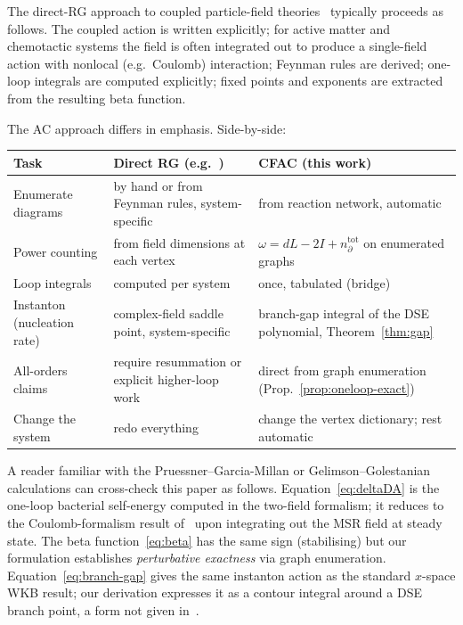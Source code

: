 \documentclass[11pt,a4paper]{article}
\theoremstyle{plain}
\begin{document}
The direct-RG approach to coupled particle-field
theories~\cite{PruessnerGarciaMillan2025,Bothe2023,%
GelimsonGolestanian2015} typically proceeds as follows.  The
coupled action is written explicitly; for active matter and
chemotactic systems the field is often integrated out to produce
a single-field action with nonlocal (e.g.\ Coulomb)
interaction; Feynman rules are derived; one-loop integrals are
computed explicitly; fixed points and exponents are extracted from
the resulting beta function.

The AC approach differs in emphasis.  Side-by-side:

\begin{center}\small
\begin{tabular}{@{}p{}p{}p{}@{}}
\toprule
\textbf{Task} & \textbf{Direct RG (e.g.\ \cite{PruessnerGarciaMillan2025,GelimsonGolestanian2015})} & \textbf{CFAC (this work)} \\
\midrule
Enumerate diagrams & by hand or from Feynman rules, system-specific & from reaction network, automatic \\
\addlinespace
Power counting & from field dimensions at each vertex & $\omega = dL - 2I + n_\partial^{\mathrm{tot}}$ on enumerated graphs \\
\addlinespace
Loop integrals & computed per system & once, tabulated (bridge) \\
\addlinespace
Instanton (nucleation rate) & complex-field saddle point, system-specific & branch-gap integral of the DSE polynomial, Theorem~\ref{thm:gap} \\
\addlinespace
All-orders claims & require resummation or explicit higher-loop work & direct from graph enumeration (Prop.~\ref{prop:oneloop-exact}) \\
\addlinespace
Change the system & redo everything & change the vertex dictionary; rest automatic \\
\bottomrule\end{tabular}
\end{center}

A reader familiar with the Pruessner--Garcia-Millan or
Gelimson--Golestanian calculations can cross-check this paper as
follows.  Equation~\eqref{eq:deltaDA} is the one-loop bacterial
self-energy computed in the two-field formalism; it reduces to
the Coulomb-formalism result of~\cite{GelimsonGolestanian2015}
upon integrating out the MSR field at steady state.  The beta
function~\eqref{eq:beta} has the same sign (stabilising) but our
formulation establishes \emph{perturbative exactness} via
graph enumeration.  Equation~\eqref{eq:branch-gap} gives the
same instanton action as the standard $x$-space WKB result; our
derivation expresses it as a contour integral around a DSE branch
point, a form not given in~\cite{PruessnerGarciaMillan2025}.
\end{document}
